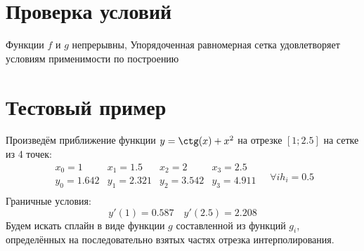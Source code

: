 \documentclass[a4paper]{article}
\begin{document}
\section{Проверка условий}
Функции \(f\) и \(g\) непрерывны,
Упорядоченная равномерная сетка удовлетворяет условиям применимости по построению
\section{Тестовый пример}
Произведём приближение функции $y = \ctg(x)+x^{2}$ на отрезке $[1;2.5]$ на сетке из 4 точек:\[
\begin{matrix}
x_{0} = 1& x_{1} = 1.5& x_{2} = 2& x_{3} = 2.5\\
y_{0} = 1.642& y_{1} = 2.321& y_{2} = 3.542& y_{3} = 4.911\\
\end{matrix} \quad \forall i h_{i} = 0.5
\]
Граничные условия: \[
  y'(1) = 0.587 \quad y'(2.5) = 2.208
\]
Будем искать сплайн в виде функции \(g\) составленной из функций \(g_{i}\), определённых на последовательно взятых
частях отрезка интерполирования.
\end{document}
